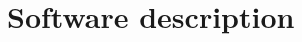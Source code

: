 \documentclass[preprint,12pt, a4paper]{elsarticle}
\begin{document}




\section{Software description}

\end{document}
